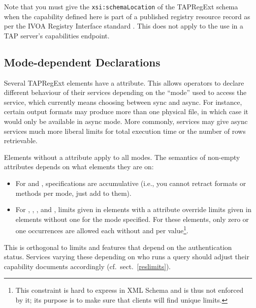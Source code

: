 \documentclass{ivoa}
\begin{document}
Note that you must give the \texttt{xsi:schemaLocation} of
the TAPRegExt schema when the capability defined here is part of a published
registry resource record as per the IVOA Registry Interface standard
\citep{2018ivoa.spec.0723D}.  This does not apply to the use
in a TAP server's capabilities endpoint.


\subsection{Mode-dependent Declarations}
\label{sect:modedep}

Several TAPRegExt elements have a  attribute.  This
allows operators to declare different behaviour of their services
depending on the ``mode'' used to access the service, which currently
means choosing between sync and async.  For instance, certain output
formats may produce more than one physical file, in which case it would
only be available in async mode.  More commonly, services may give async
services much more liberal limits for total execution time or the number
of rows retrievable.

Elements without a  attribute apply to all modes.  The
semantics of non-empty  attributes depends on what
elements they are on:

\begin{itemize}
\item For  and , specifications
are accumulative (i.e., you cannot retract formats or methods per mode,
just add to them).

\item For , ,
, and , limits given in elements
with a  attribute override limits given in elements
without one for the mode specified.  For these elements, only zero or
one occurrences are allowed each without  and per
 value\footnote{This constraint is hard to express in XML
Schema and is thus not enforced by it; its purpose is to make sure that
clients will find unique limits.}.

\end{itemize}

This is orthogonal to limits and features that depend on the
authentication status.  Services varying these depending on who runs a
query should adjust their capability documents accordingly
(cf.~sect.~\ref{reslimits}).
\end{document}
